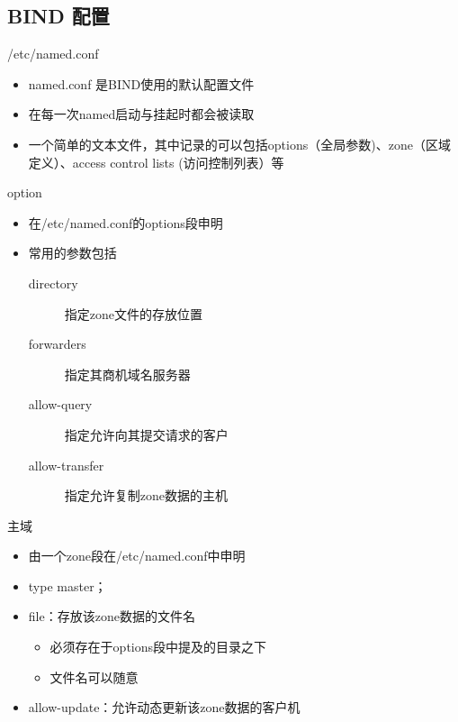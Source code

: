 \subsection{BIND 配置}


\begin{frame}{/etc/named.conf}
\begin{itemize}
\item named.conf 是BIND使用的默认配置文件
\item 在每一次named启动与挂起时都会被读取
\item 一个简单的文本文件，其中记录的可以包括options（全局参数)、zone（区域定义）、access control lists (访问控制列表）等
\end{itemize}

\end{frame} 
\begin{frame}{option}
\begin{itemize}
\item 在/etc/named.conf的options段申明
\item 常用的参数包括

\begin{description}
\item [{directory}] 指定zone文件的存放位置
\item [{forwarders}] 指定其商机域名服务器
\item [{allow-query}] 指定允许向其提交请求的客户
\item [{allow-transfer}] 指定允许复制zone数据的主机
\end{description}
\end{itemize}

\end{frame} 
\begin{frame}{主域}


\begin{itemize}
\item 由一个zone段在/etc/named.conf中申明
\item type master；
\item file：存放该zone数据的文件名

\begin{itemize}
\item 必须存在于options段中提及的目录之下
\item 文件名可以随意
\end{itemize}
\item allow-update：允许动态更新该zone数据的客户机
\end{itemize}

\end{frame} 
